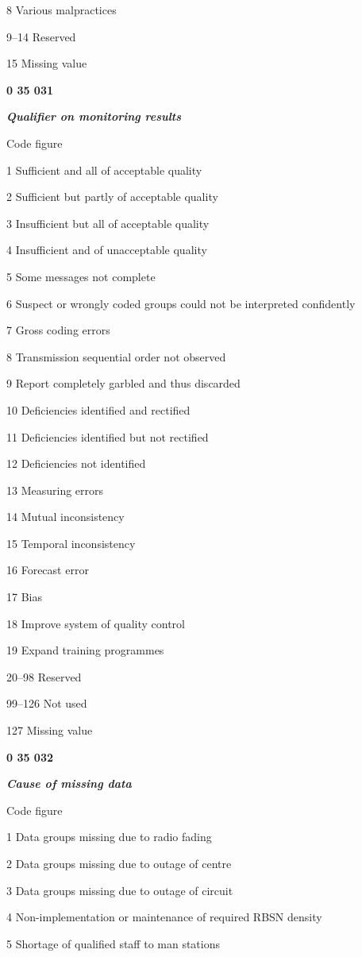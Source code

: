 8 Various malpractices

9--14 Reserved

15 Missing value

\textbf{0 35 031}

\emph{\textbf{Qualifier on monitoring results}}

Code figure

1 Sufficient and all of acceptable quality

2 Sufficient but partly of acceptable quality

3 Insufficient but all of acceptable quality

4 Insufficient and of unacceptable quality

5 Some messages not complete

6 Suspect or wrongly coded groups could not be interpreted confidently

7 Gross coding errors

8 Transmission sequential order not observed

9 Report completely garbled and thus discarded

10 Deficiencies identified and rectified

11 Deficiencies identified but not rectified

12 Deficiencies not identified

13 Measuring errors

14 Mutual inconsistency

15 Temporal inconsistency

16 Forecast error

17 Bias

18 Improve system of quality control

19 Expand training programmes

20--98 Reserved

99--126 Not used

127 Missing value

\textbf{0 35 032}

\emph{\textbf{Cause of missing data}}

Code figure

1 Data groups missing due to radio fading

2 Data groups missing due to outage of centre

3 Data groups missing due to outage of circuit

4 Non-implementation or maintenance of required RBSN density

5 Shortage of qualified staff to man stations

